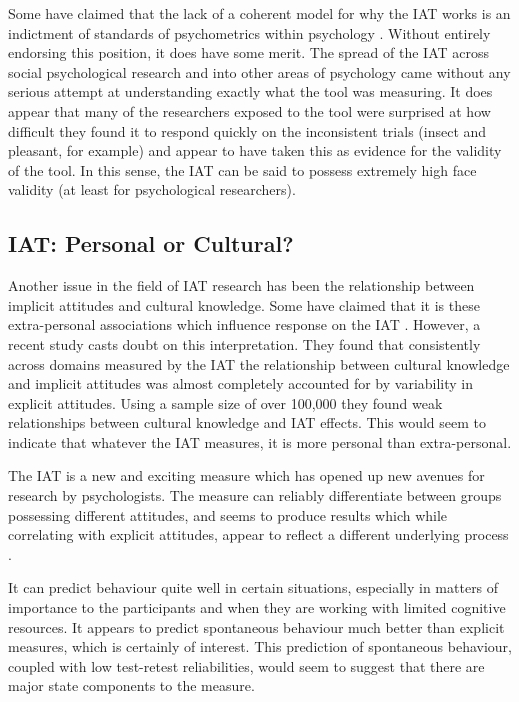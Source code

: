  Some have claimed that the lack of a coherent model for why the IAT works is an indictment of standards of psychometrics within psychology \cite{borsboom2006attack}. Without entirely endorsing this position, it does have some merit. The spread of the IAT across social psychological research and into other areas of psychology came without any serious attempt at understanding exactly what the tool was measuring. It does appear that many of the researchers exposed to the tool were surprised at how difficult they found it to respond quickly on the inconsistent trials (insect and pleasant, for example) and appear to have taken this as evidence for the validity of the tool. In this sense, the IAT can be said to possess extremely high face validity (at least for psychological researchers). 


\subsection{IAT: Personal or Cultural?}
\label{sec:iat:-personal-or}


Another issue in the field of IAT research has been the relationship between implicit attitudes and cultural knowledge. Some have claimed that it is these extra-personal associations which influence response on the IAT \cite{Olson2004}. However, a recent study \cite{Nosek2007a} casts doubt on this interpretation. They found that consistently across domains measured by the IAT the relationship between cultural knowledge and implicit attitudes was almost completely accounted for by variability in explicit attitudes. Using a sample size of over 100,000 they found weak relationships between cultural knowledge and IAT effects. This would seem to indicate that whatever the IAT measures, it is more personal than extra-personal. 

The IAT is a new and exciting measure which has opened up new avenues for research by psychologists.   The measure can reliably differentiate between groups possessing different attitudes, and seems to produce results which while correlating with explicit attitudes, appear to reflect a different underlying process \cite{Nosek2007a}. 

It can predict behaviour quite well in certain situations, especially in matters of importance to the participants and when they are working with limited cognitive resources. It appears to predict spontaneous behaviour much better than explicit measures, which is certainly of interest. This prediction of spontaneous behaviour, coupled with low test-retest reliabilities, would seem to suggest that there are major state components to the measure. 

